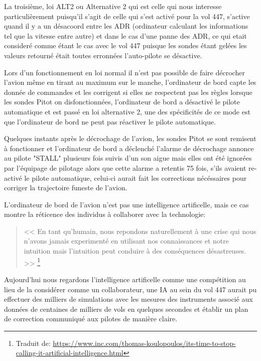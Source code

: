         La troisième, loi ALT2 ou Alternative 2 qui est celle qui nous interesse particulièrement 
        puisqu'il s'agit de celle qui s'est activé pour la vol 447, s'active quand il y a un désacoord
        entre les ADR (ordinateur calculant les informations tel que la vitesse entre autre)
        et dans le cas d'une panne des ADR, ce qui etait consideré comme étant le cas avec 
        le vol 447 puisque les sondes étant gelées les valeurs retourné était toutes erronnées
        l'auto-pilote se désactive. 
        \newline

        Lors d'un fonctionnement en loi normal il n'est pas possible de faire décrocher l'avion 
        même en tirant au maximum sur le manche, l'ordinateur de bord 
        capte les donnée de commandes et les corrigent si elles ne respectent pas les règles 
        lorsque les sondes Pitot on disfonctionnées, l'ordinateur de bord a désactivé le 
        pilote automatique et est passé en loi alternative 2, une des spécificités 
        de ce mode est que l'ordinateur de bord ne peut pas réactiver le pilote automatique.
        \newline 

        Quelques instants après le décrochage de l'avion, les sondes Pitot se sont remisent 
        à fonctionner et l'ordinateur de bord a déclenché l'alarme de décrochage annonce
        au pilote "STALL" plusieurs fois suivis d'un son aigue mais elles ont été 
        ignorées par l'équipage de pilotage alors que cette alarme a retentis 75 fois, 
        s'ils avaient re-activé le pilote automatique, celui-ci aurait fait les
        corrections nécéssaires pour corriger la trajectoire funeste de l'avion. 
        
        L'ordinateur de bord de l'avion n'est pas une intelligence artificelle,
        mais ce cas montre la réticence des individus à collaborer avec la 
        technologie: \newline
        \begin{quote}
            << En tant qu'humain, nous repondons naturellement à une crise qui nous n'avons 
            jamais experimenté en utilisant nos connaissances et notre intuition mais 
            l'intuition peut conduire à des conséquences désastreuses. >> 
            \footnote{Traduit de: \url{https://www.inc.com/thomas-koulopoulos/its-time-to-stop-calling-it-artificial-intelligence.html}}
            \newline 
        \end{quote}

        Aujourd'hui nous regardons l'intelligence artificelle comme une compétition au lieu 
        de la considérer comme un collaborateur, une IA au sein du vol 447 aurait pu effectuer 
        des milliers de simulations avec les mesures des instruments associé aux données 
        de centaines de milliers de vols en quelques secondes et établir un plan de correction
        communiqué aux pilotes de manière claire.